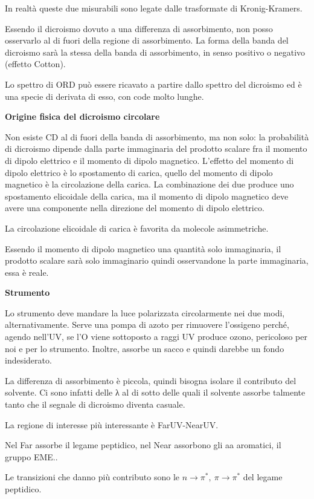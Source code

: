 In realtà queste due misurabili sono legate dalle trasformate di
Kronig-Kramers.

Essendo il dicroismo dovuto a una differenza di assorbimento, non posso
osservarlo al di fuori della regione di assorbimento. La forma della
banda del dicroismo sarà la stessa della banda di assorbimento, in senso
positivo o negativo (effetto Cotton).

Lo spettro di ORD può essere ricavato a partire dallo spettro del
dicroismo ed è una specie di derivata di esso, con code molto lunghe.

\textbf{Origine fisica del dicroismo circolare}

Non esiste CD al di fuori della banda di assorbimento, ma non solo: la
probabilità di dicroismo dipende dalla parte immaginaria del prodotto
scalare fra il momento di dipolo elettrico e il momento di dipolo
magnetico. L'effetto del momento di dipolo elettrico è lo spostamento di
carica, quello del momento di dipolo magnetico è la circolazione della
carica. La combinazione dei due produce uno spostamento elicoidale della
carica, ma il momento di dipolo magnetico deve avere una componente
nella direzione del momento di dipolo elettrico.

La circolazione elicoidale di carica è favorita da molecole
asimmetriche.

Essendo il momento di dipolo magnetico una quantità solo immaginaria, il
prodotto scalare sarà solo immaginario quindi osservandone la parte
immaginaria, essa è reale.

\textbf{Strumento }

Lo strumento deve mandare la luce polarizzata circolarmente nei due
modi, alternativamente. Serve una pompa di azoto per rimuovere
l'ossigeno perché, agendo nell'UV, se l'O viene sottoposto a raggi UV
produce ozono, pericoloso per noi e per lo strumento. Inoltre, assorbe
un sacco e quindi darebbe un fondo indesiderato.

La differenza di assorbimento è piccola, quindi bisogna isolare il
contributo del solvente. Ci sono infatti delle λ al di sotto delle quali
il solvente assorbe talmente tanto che il segnale di dicroismo diventa
casuale.

La regione di interesse più interessante è FarUV-NearUV.

Nel Far assorbe il legame peptidico, nel Near assorbono gli aa
aromatici, il gruppo EME..

Le transizioni che danno più contributo sono le
\(n \rightarrow \pi^{*},\ \pi \rightarrow \pi^{*}\) del legame
peptidico.

